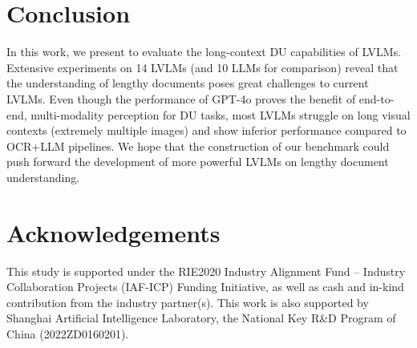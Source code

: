 \section{Conclusion}
\label{sec:conclusion}
In this work, we present \benchmarkname to evaluate the long-context DU capabilities of LVLMs. Extensive experiments on 14 LVLMs (and 10 LLMs for comparison) reveal that the understanding of lengthy documents poses great challenges to current LVLMs. Even though the performance of GPT-4o proves the benefit of end-to-end, multi-modality perception for DU tasks, most LVLMs struggle on long visual contexts (\ie extremely multiple images) and show inferior performance compared to OCR+LLM pipelines. We hope that the construction of our benchmark could push forward the development of more powerful LVLMs on lengthy document understanding.

\section*{Acknowledgements}
This study is supported under the RIE2020 Industry Alignment Fund – Industry Collaboration Projects (IAF-ICP) Funding Initiative, as well as cash and in-kind contribution from the industry partner(s). This work is also supported by Shanghai Artificial Intelligence Laboratory, the National Key R\&D Program of China (2022ZD0160201).
